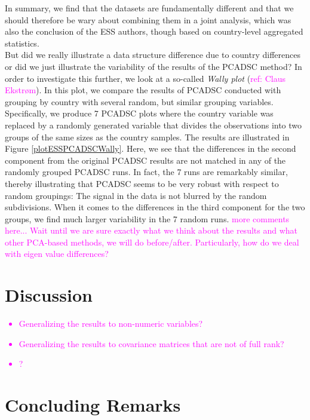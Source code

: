 \documentclass[titlepage,11pt,twoside]{article}
\newcommand{\hl}[1]{\textcolor{magenta}{#1}}
\begin{document}
In summary, we find that the datasets are fundamentally different and that we should therefore be wary about combining them in a joint analysis, which was also the conclusion of the ESS authors, though based on country-level aggregated statistics. \\


But did we really illustrate a data structure difference due to country differences or did we just illustrate the variability of the results of the PCADSC method? In order to investigate this further, we look at a so-called \textit{Wally plot} (\hl{ref: Claus Ekstrøm}). In this plot, we compare the results of PCADSC conducted with grouping by country with several random, but similar grouping variables. Specifically, we produce 7 PCADSC plots where the country variable was replaced by a randomly generated variable that divides the observations into two groups of the same sizes as the country samples. The results are illustrated in Figure \ref{plotESSPCADSCWally}. Here, we see that the differences in the second component from the original PCADSC results are not matched in any of the randomly grouped PCADSC runs. In fact, the 7 runs are remarkably similar, thereby illustrating that PCADSC seems to be very robust with respect to random groupings: The signal in the data is not blurred by the random subdivisions. When it comes to the differences in the third component for the two groups, we find much larger variability in the 7 random runs. \hl{more comments here... Wait until we are sure exactly what we think about the results and what other PCA-based methods, we will do before/after. Particularly, how do we deal with eigen value differences?}



\section{Discussion}
\label{sec:discussion}
\hl{
\begin{itemize}
\item Generalizing the results to non-numeric variables?
\item Generalizing the results to covariance matrices that are not of full rank?
\item ?
\end{itemize}
}

\section{Concluding Remarks}
\label{sec:conclusion}

\vspace{\fill}\clearpage
\newpage


\end{document}
